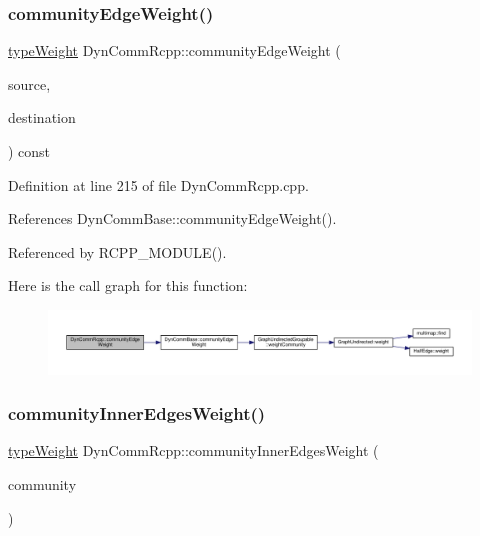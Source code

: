 \subsubsection{\texorpdfstring{community\+Edge\+Weight()}{communityEdgeWeight()}}
{\footnotesize\ttfamily \hyperlink{edge_8h_a2e7ea3be891ac8b52f749ec73fee6dd2}{type\+Weight} Dyn\+Comm\+Rcpp\+::community\+Edge\+Weight (\begin{DoxyParamCaption}\item[{\hyperlink{graphUndirectedGroupable_8h_a914da95c9ea7f14f4b7f875c36818556}{type\+Community}}]{source,  }\item[{\hyperlink{graphUndirectedGroupable_8h_a914da95c9ea7f14f4b7f875c36818556}{type\+Community}}]{destination }\end{DoxyParamCaption}) const\hspace{0.3cm}{\ttfamily [inline]}}



Definition at line 215 of file Dyn\+Comm\+Rcpp.\+cpp.



References Dyn\+Comm\+Base\+::community\+Edge\+Weight().



Referenced by R\+C\+P\+P\+\_\+\+M\+O\+D\+U\+L\+E().

Here is the call graph for this function\+:
\nopagebreak
\begin{figure}[H]
\begin{center}
\leavevmode
\includegraphics[width=350pt]{classDynCommRcpp_ad74a2abe244e62d9df2b98aeea0d3155_cgraph}
\end{center}
\end{figure}
\mbox{\label{classDynCommRcpp_aed6b4f1e844956429eb9a15d8d6df7b6}} 
\subsubsection{\texorpdfstring{community\+Inner\+Edges\+Weight()}{communityInnerEdgesWeight()}}
{\footnotesize\ttfamily \hyperlink{edge_8h_a2e7ea3be891ac8b52f749ec73fee6dd2}{type\+Weight} Dyn\+Comm\+Rcpp\+::community\+Inner\+Edges\+Weight (\begin{DoxyParamCaption}\item[{int}]{community }\end{DoxyParamCaption})\hspace{0.3cm}{\ttfamily [inline]}}



